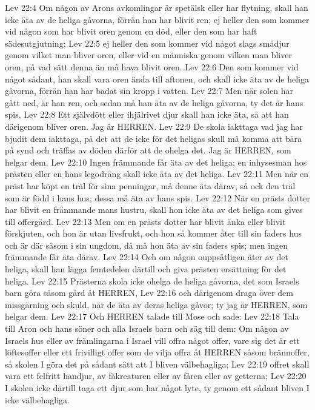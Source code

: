 Lev 22:4  Om någon av Arons avkomlingar är spetälsk eller har flytning, skall han icke äta av de heliga gåvorna, förrän han har blivit ren; ej heller den som kommer vid någon som har blivit oren genom en död, eller den som har haft sädesutgjutning;
Lev 22:5  ej heller den som kommer vid något slags smådjur genom vilket man bliver oren, eller vid en människa genom vilken man bliver oren, på vad sätt denna än må hava blivit oren.
Lev 22:6  Den som kommer vid något sådant, han skall vara oren ända till aftonen, och skall icke äta av de heliga gåvorna, förrän han har badat sin kropp i vatten.
Lev 22:7  Men när solen har gått ned, är han ren, och sedan må han äta av de heliga gåvorna, ty det är hans spis.
Lev 22:8  Ett självdött eller ihjälrivet djur skall han icke äta, så att han därigenom bliver oren. Jag är HERREN.
Lev 22:9  De skola iakttaga vad jag har bjudit dem iakttaga, på det att de icke för det heligas skull må komma att bära på synd och träffas av döden därför att de ohelga det. Jag är HERREN, som helgar dem.
Lev 22:10  Ingen främmande får äta av det heliga; en inhysesman hos prästen eller en hans legodräng skall icke äta av det heliga.
Lev 22:11  Men när en präst har köpt en träl för sina penningar, må denne äta därav, så ock den träl som är född i hans hus; dessa må äta av hans spis.
Lev 22:12  När en prästs dotter har blivit en främmande mans hustru, skall hon icke äta av det heliga som gives till offergärd.
Lev 22:13  Men om en prästs dotter har blivit änka eller blivit förskjuten, och hon är utan livsfrukt, och hon så kommer åter till sin faders hus och är där såsom i sin ungdom, då må hon äta av sin faders spis; men ingen främmande får äta därav.
Lev 22:14  Och om någon ouppsåtligen äter av det heliga, skall han lägga femtedelen därtill och giva prästen ersättning för det heliga.
Lev 22:15  Prästerna skola icke ohelga de heliga gåvorna, det som Israels barn göra såsom gärd åt HERREN,
Lev 22:16  och därigenom draga över dem missgärning och skuld, när de äta av deras heliga gåvor; ty jag är HERREN, som helgar dem.
Lev 22:17  Och HERREN talade till Mose och sade:
Lev 22:18  Tala till Aron och hans söner och alla Israels barn och säg till dem: Om någon av Israels hus eller av främlingarna i Israel vill offra något offer, vare sig det är ett löftesoffer eller ett frivilligt offer som de vilja offra åt HERREN såsom brännoffer, så skolen I göra det på sådant sätt att I bliven välbehagliga;
Lev 22:19  offret skall vara ett felfritt handjur, av fäkreaturen eller av fåren eller av getterna;
Lev 22:20  I skolen icke därtill taga ett djur som har något lyte, ty genom ett sådant bliven I icke välbehagliga.
